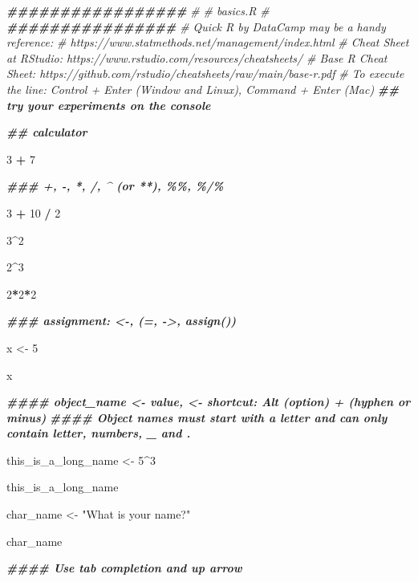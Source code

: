 \documentclass[
  xelatex, ja=standard]{bxjsbook}
\newenvironment{Shaded}{\begin{snugshade}}{\end{snugshade}}
\newcommand{\CommentTok}[1]{\textcolor[rgb]{0.56,0.35,0.01}{\textit{#1}}}
\newcommand{\DecValTok}[1]{\textcolor[rgb]{0.00,0.00,0.81}{#1}}
\newcommand{\DocumentationTok}[1]{\textcolor[rgb]{0.56,0.35,0.01}{\textbf{\textit{#1}}}}
\newcommand{\NormalTok}[1]{#1}
\newcommand{\OtherTok}[1]{\textcolor[rgb]{0.56,0.35,0.01}{#1}}
\newcommand{\SpecialCharTok}[1]{\textcolor[rgb]{0.81,0.36,0.00}{\textbf{#1}}}
\newcommand{\StringTok}[1]{\textcolor[rgb]{0.31,0.60,0.02}{#1}}
\theoremstyle{definition}
\theoremstyle{definition}
\theoremstyle{definition}
\theoremstyle{definition}
\theoremstyle{remark}
\begin{document}
\begin{Shaded}
\begin{Highlighting}[]
\DocumentationTok{\#\#\#\#\#\#\#\#\#\#\#\#\#\#\#\#\#}
\CommentTok{\#}
\CommentTok{\# basics.R}
\CommentTok{\#}
\DocumentationTok{\#\#\#\#\#\#\#\#\#\#\#\#\#\#\#\#}
\CommentTok{\# \textquotesingle{}Quick R\textquotesingle{} by DataCamp may be a handy reference: }
\CommentTok{\#     https://www.statmethods.net/management/index.html}
\CommentTok{\# Cheat Sheet at RStudio: https://www.rstudio.com/resources/cheatsheets/}
\CommentTok{\# Base R Cheat Sheet: https://github.com/rstudio/cheatsheets/raw/main/base{-}r.pdf}
\CommentTok{\# To execute the line: Control + Enter (Window and Linux), Command + Enter (Mac)}
\DocumentationTok{\#\# try your experiments on the console}

\DocumentationTok{\#\# calculator}

\DecValTok{3} \SpecialCharTok{+} \DecValTok{7}

\DocumentationTok{\#\#\# +, {-}, *, /, \^{} (or **), \%\%, \%/\%}

\DecValTok{3} \SpecialCharTok{+} \DecValTok{10} \SpecialCharTok{/} \DecValTok{2}

\DecValTok{3}\SpecialCharTok{\^{}}\DecValTok{2}

\DecValTok{2}\SpecialCharTok{\^{}}\DecValTok{3}

\DecValTok{2}\SpecialCharTok{*}\DecValTok{2}\SpecialCharTok{*}\DecValTok{2}

\DocumentationTok{\#\#\# assignment: \textless{}{-}, (=, {-}\textgreater{}, assign()) }

\NormalTok{x }\OtherTok{\textless{}{-}} \DecValTok{5}

\NormalTok{x }

\DocumentationTok{\#\#\#\# object\_name \textless{}{-} value, \textquotesingle{}\textless{}{-}\textquotesingle{} shortcut: Alt (option) + \textquotesingle{}{-}\textquotesingle{} (hyphen or minus) }
\DocumentationTok{\#\#\#\# Object names must start with a letter and can only contain letter, numbers, \_ and .}

\NormalTok{this\_is\_a\_long\_name }\OtherTok{\textless{}{-}} \DecValTok{5}\SpecialCharTok{\^{}}\DecValTok{3}

\NormalTok{this\_is\_a\_long\_name}

\NormalTok{char\_name }\OtherTok{\textless{}{-}} \StringTok{"What is your name?"}

\NormalTok{char\_name}

\DocumentationTok{\#\#\#\# Use \textquotesingle{}tab completion\textquotesingle{} and \textquotesingle{}up arrow\textquotesingle{}}


\end{Highlighting}
\end{Shaded}
\end{document}
